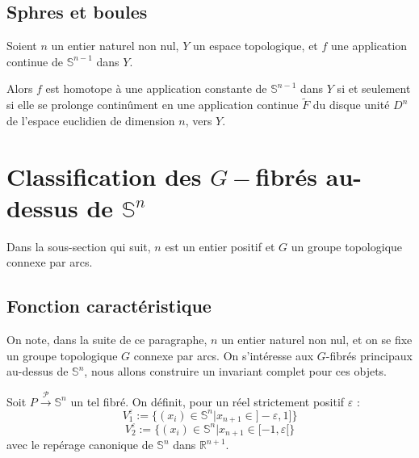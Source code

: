 
\subsection{Sphres et boules}

\begin{prop}\label{hsd}
Soient $n$ un entier naturel non nul, $Y$ un espace topologique, et $f$ une application continue de $\mathbb{S}^{n-1}$ dans $Y$.

\par
Alors $f$ est homotope à une application constante de $\mathbb{S}^{n-1}$ dans $Y$ si et seulement si %
elle se prolonge continûment en une application continue $\tilde{F}$ du disque unité $D^n$ de l'espace euclidien de dimension $n$, vers $Y$.
\end{prop}

\section{Classification des $G-$fibr\'es au-dessus de $\mathbb{S}^n$}

Dans la sous-section qui suit, $n$ est un entier positif et $G$ un groupe topologique connexe par arcs.

\subsection{Fonction caract\'eristique}
%

On note, dans la suite de ce paragraphe, $n$ un entier naturel non nul, et on se fixe un groupe topologique $G$ connexe par arcs. %
On s'intéresse aux $G$-fibrés principaux au-dessus de $\mathbb{S}^n$, nous allons construire un invariant complet pour ces objets.

\par
Soit $P \xrightarrow{\mathcal{P}} \mathbb{S}^n$ un tel fibré. On définit, pour un réel strictement positif $\varepsilon$ :
\[
V_1^{\varepsilon} := \{(x_i) \in \mathbb{S}^n | x_{n+1} \in ]-\varepsilon , 1]\}%
\]
%
\[
V_2^{\varepsilon} := \{(x_i) \in \mathbb{S}^n | x_{n+1} \in [-1,\varepsilon [ \}%
\]
avec le repérage canonique de $\mathbb{S}^n$ dans $\mathbb{R}^{n+1}$.

